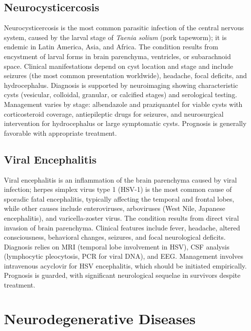 \subsection{Neurocysticercosis}
\label{sec:Neurocysticercosis}
Neurocysticercosis is the most common parasitic infection of the central nervous system, caused by the larval stage of \textit{Taenia solium} (pork tapeworm); it is endemic in Latin America, Asia, and Africa. The condition results from encystment of larval forms in brain parenchyma, ventricles, or subarachnoid space. Clinical manifestations depend on cyst location and stage and include seizures (the most common presentation worldwide), headache, focal deficits, and hydrocephalus. Diagnosis is supported by neuroimaging showing characteristic cysts (vesicular, colloidal, granular, or calcified stages) and serological testing. Management varies by stage: albendazole and praziquantel for viable cysts with corticosteroid coverage, antiepileptic drugs for seizures, and neurosurgical intervention for hydrocephalus or large symptomatic cysts. Prognosis is generally favorable with appropriate treatment.

\subsection{Viral Encephalitis}
\label{sec:Viral Encephalitis}
Viral encephalitis is an inflammation of the brain parenchyma caused by viral infection; herpes simplex virus type 1 (HSV-1) is the most common cause of sporadic fatal encephalitis, typically affecting the temporal and frontal lobes, while other causes include enteroviruses, arboviruses (West Nile, Japanese encephalitis), and varicella-zoster virus. The condition results from direct viral invasion of brain parenchyma. Clinical features include fever, headache, altered consciousness, behavioral changes, seizures, and focal neurological deficits. Diagnosis relies on MRI (temporal lobe involvement in HSV), CSF analysis (lymphocytic pleocytosis, PCR for viral DNA), and EEG. Management involves intravenous acyclovir for HSV encephalitis, which should be initiated empirically. Prognosis is guarded, with significant neurological sequelae in survivors despite treatment.

\section{Neurodegenerative Diseases}

